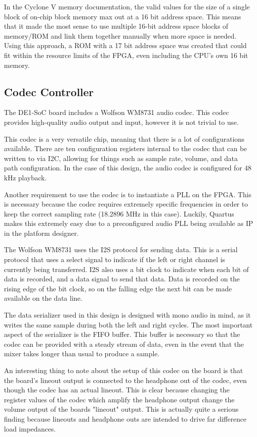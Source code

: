\documentclass{subfile}
\begin{document}
  In the Cyclone V memory documentation, the valid values for the size of a single block of 
  on-chip block memory max out at a
  16 bit address space. 
  This means that it made the most sense to use multiple 16-bit address space blocks of 
  memory/ROM and link them together manually when more space is needed. 
  Using this approach, a ROM with a 17 bit address space was created that could fit within 
  the resource limits of the FPGA, even including the CPU's own 16 bit memory.

  \subsection{Codec Controller} 
  The DE1-SoC board includes a Wolfson WM8731 audio codec. 
  This codec provides high-quality audio output and input, however it is not 
  trivial to use. 

  This codec is a very versatile chip, meaning that there is a lot of configurations 
  available.
  There are ten configuration registers internal to the codec that can be written to via I2C, 
  allowing for things such as sample rate, volume, and data path configuration.
  In the case of this design, the audio codec is configured for 48 kHz playback.

  Another requirement to use the codec is to instantiate a PLL on the FPGA. 
  This is necessary because the codec requires extremely specific frequencies in order 
  to keep the correct sampling rate (18.2896 MHz in this case).   %
  Luckily, Quartus makes this extremely easy due to a preconfigured audio PLL being 
  available as IP in the platform designer.

  The Wolfson WM8731 uses the I2S protocol for sending data.
  This is a serial protocol that uses a select signal to indicate if the left or right 
  channel is currently being transferred.
  I2S also uses a bit clock to indicate when each bit of data is recorded, and a data signal 
  to send that data. 
  Data is recorded on the rising edge of the bit clock, so on the falling edge the 
  next bit can be made available on the data line.

  The data serializer used in this design is designed with mono audio in mind, 
  as it writes the same sample during both the left and right cycles.
  The most important aspect of the serializer is the FIFO buffer. 
  This buffer is necessary so that the codec can be provided with a steady stream of data, 
  even in the event that the mixer takes longer than usual to produce a sample. 

  An interesting thing to note about the setup of this codec on the board is that the 
  board's lineout output is connected to the headphone out of the codec, even though the 
  codec has an actual lineout. 
  This is clear because changing the register values of the codec which amplify the 
  headphone output change the volume output of the boards "lineout" output.
  This is actually quite a serious finding because lineouts and headphone outs 
  are intended to drive far difference load impedances.
\end{document}

